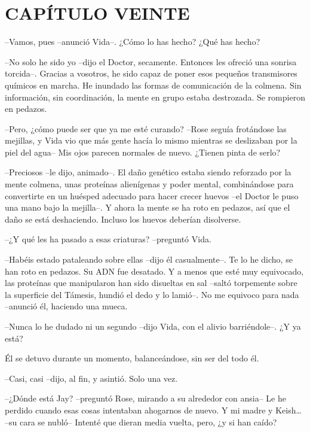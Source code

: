 \chapter*{CAPÍTULO VEINTE}

{--Vamos, pues --anunció Vida--. ¿Cómo lo has hecho? ¿Qué has hecho?}

{--No solo he sido yo --dijo el Doctor, secamente. Entonces les ofreció
 una sonrisa torcida--. Gracias a vosotros, he sido capaz de poner esos
 pequeños transmisores químicos en marcha. He inundado las formas de
 comunicación de la colmena. Sin información, sin coordinación, la mente
en grupo estaba destrozada. Se rompieron en pedazos.}

{--Pero, ¿cómo puede ser que ya me esté curando? --Rose seguía
 frotándose las mejillas, y Vida vio que más gente hacía lo mismo
 mientras se deslizaban por la piel del agua-- Mis ojos parecen normales
de nuevo. ¿Tienen pinta de serlo?}

{--Preciosos --le dijo, animado--. El daño genético estaba siendo
 reforzado por la mente colmena, unas proteínas alienígenas y poder
 mental, combinándose para convertirte en un huésped adecuado para hacer
 crecer huevos --el Doctor le puso una mano bajo la mejilla--. Y ahora la
 mente se ha roto en pedazos, así que el daño se está deshaciendo.
Incluso los huevos deberían disolverse.}

{--¿Y qué les ha pasado a esas criaturas? --preguntó Vida.}

{--Habéis estado pataleando sobre ellas --dijo él casualmente--. Te lo
 he dicho, se han roto en pedazos. Su ADN fue desatado. Y a menos que
 esté muy equivocado, las proteínas que manipularon han sido disueltas en
 sal --saltó torpemente sobre la superficie del Támesis, hundió el dedo y
lo lamió--. No me equivoco para nada --anunció él, haciendo una mueca.}

{--Nunca lo he dudado ni un segundo --dijo Vida, con el alivio
barriéndole--. ¿Y ya está?}

{Él se detuvo durante un momento, balanceándose, sin ser del todo él.}

{--Casi, casi --dijo, al fin, y asintió. Solo una vez.}

{--¿Dónde está Jay? --preguntó Rose, mirando a su alrededor con ansia--
 Le he perdido cuando esas cosas intentaban ahogarnos de nuevo. Y mi
 madre y Keish\ldots{} --su cara se nubló-- Intenté que dieran media
vuelta, pero, ¿y si han caído?}

